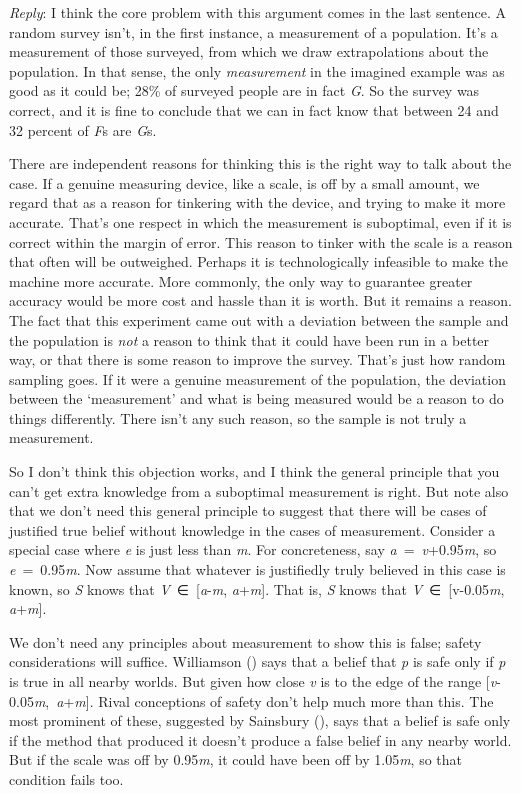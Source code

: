 \documentclass[
  10pt,
  letterpaper,
  DIV=11,
  numbers=noendperiod,
  twoside]{scrartcl}
\begin{document}
\emph{Reply}: I think the core problem with this argument comes in the
last sentence. A random survey isn't, in the first instance, a
measurement of a population. It's a measurement of those surveyed, from
which we draw extrapolations about the population. In that sense, the
only \emph{measurement} in the imagined example was as good as it could
be; 28\% of surveyed people are in fact \emph{G}. So the survey was
correct, and it is fine to conclude that we can in fact know that
between 24 and 32 percent of \emph{F}s are \emph{G}s.

There are independent reasons for thinking this is the right way to talk
about the case. If a genuine measuring device, like a scale, is off by a
small amount, we regard that as a reason for tinkering with the device,
and trying to make it more accurate. That's one respect in which the
measurement is suboptimal, even if it is correct within the margin of
error. This reason to tinker with the scale is a reason that often will
be outweighed. Perhaps it is technologically infeasible to make the
machine more accurate. More commonly, the only way to guarantee greater
accuracy would be more cost and hassle than it is worth. But it remains
a reason. The fact that this experiment came out with a deviation
between the sample and the population is \emph{not} a reason to think
that it could have been run in a better way, or that there is some
reason to improve the survey. That's just how random sampling goes. If
it were a genuine measurement of the population, the deviation between
the `measurement' and what is being measured would be a reason to do
things differently. There isn't any such reason, so the sample is not
truly a measurement.

So I don't think this objection works, and I think the general principle
that you can't get extra knowledge from a suboptimal measurement is
right. But note also that we don't need this general principle to
suggest that there will be cases of justified true belief without
knowledge in the cases of measurement. Consider a special case where
\emph{e} is just less than \emph{m}. For concreteness, say
\emph{a}~=~\emph{v}+0.95\emph{m}, so \emph{e}~=~0.95\emph{m}. Now assume
that whatever is justifiedly truly believed in this case is known, so
\emph{S} knows that \emph{V}~∈~{[}\emph{a}-\emph{m},
\emph{a}+\emph{m}{]}. That is, \emph{S} knows that
\emph{V}~∈~{[}v-0.05\emph{m}, \emph{a}+\emph{m}{]}.

We don't need any principles about measurement to show this is false;
safety considerations will suffice. Williamson
() says that a belief that
\emph{p} is safe only if \emph{p} is true in all nearby worlds. But
given how close \emph{v} is to the edge of the range
{[}\emph{v}-0.05\emph{m},~\emph{a}+\emph{m}{]}. Rival conceptions of
safety don't help much more than this. The most prominent of these,
suggested by Sainsbury (), says that a
belief is safe only if the method that produced it doesn't produce a
false belief in any nearby world. But if the scale was off by
0.95\emph{m}, it could have been off by 1.05\emph{m}, so that condition
fails too.
\end{document}

